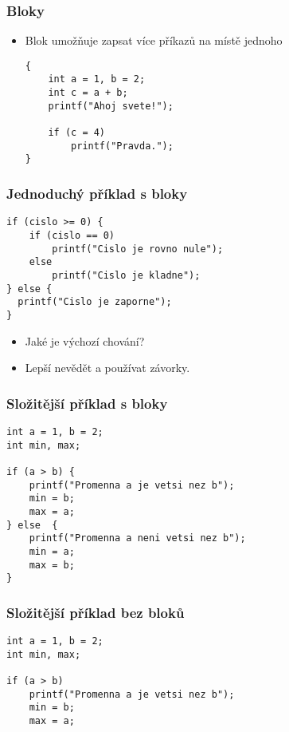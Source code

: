 \documentclass{beamer}
\newenvironment{itemizex}%
  {\large \begin{itemize}%
    \setlength{\itemsep}{8pt}%
    \setlength{\parskip}{8pt}}%
  {\end{itemize}}
\begin{document}
\begin{frame}[t,fragile]\frametitle{Bloky} 
  \begin{itemizex}
    \item Blok umožňuje zapsat více příkazů na místě jednoho
    \begin{verbatim} 
{
    int a = 1, b = 2;
    int c = a + b;
    printf("Ahoj svete!");

    if (c = 4)
        printf("Pravda.");
}
    \end{verbatim}
  \end{itemizex}
\end{frame}


\begin{frame}[t,fragile]\frametitle{Jednoduchý příklad s bloky} 
  \begin{verbatim} 
if (cislo >= 0) {
    if (cislo == 0)
        printf("Cislo je rovno nule");
    else 
        printf("Cislo je kladne");
} else {
  printf("Cislo je zaporne");
}
  \end{verbatim}

  \begin{itemizex}
    \item Jaké je výchozí chování?
    \item Lepší nevědět a používat závorky.
  \end{itemizex}
\end{frame}


\begin{frame}[t,fragile]\frametitle{Složitější příklad s bloky} 
  \begin{verbatim} 
int a = 1, b = 2;
int min, max;

if (a > b) {
    printf("Promenna a je vetsi nez b");
    min = b;
    max = a;
} else  {
    printf("Promenna a neni vetsi nez b");
    min = a;
    max = b;
}
  \end{verbatim}
\end{frame}


\begin{frame}[t,fragile]\frametitle{Složitější příklad bez bloků} 
  \begin{verbatim} 
int a = 1, b = 2;
int min, max;

if (a > b) 
    printf("Promenna a je vetsi nez b");
    min = b;
    max = a;
  \end{verbatim}
\end{frame}
\end{document}
